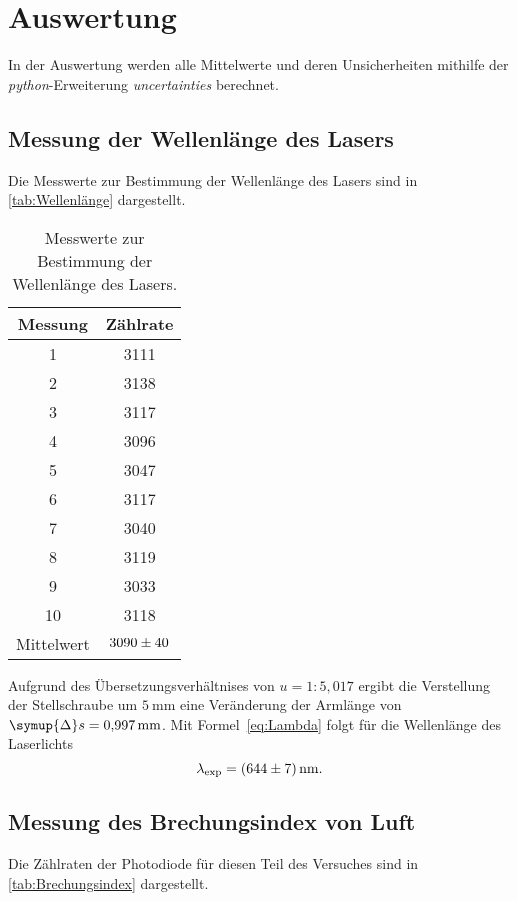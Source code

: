 \section{Auswertung}
\label{sec:Auswertung}
In der Auswertung werden alle Mittelwerte und deren Unsicherheiten mithilfe der \textit{python}-Erweiterung 
\textit{uncertainties} \cite{uncertainties} berechnet.

\subsection{Messung der Wellenlänge des Lasers}
Die Messwerte zur Bestimmung der Wellenlänge des Lasers sind in \autoref{tab:Wellenlänge} dargestellt.
\begin{table} [H]
    \centering
    \caption{Messwerte zur Bestimmung der Wellenlänge des Lasers.}
    \label{tab:Wellenlänge}
    \begin{tabular}{S S}
      \toprule
      {Messung} & {Zählrate} \\
        & 3111 \\
      2  & 3138 \\
      3  & 3117 \\
      4  & 3096 \\
      5  & 3047 \\
      6  & 3117 \\
      7  & 3040 \\
      8  & 3119 \\
      9  & 3033 \\
      10 & 3118 \\
      \midrule
      {Mittelwert} & $\num{3090+-40}$ \\  
      \bottomrule
    \end{tabular}
\end{table}

Aufgrund des Übersetzungsverhältnises von $u = 1:5,017$ ergibt die Verstellung der Stellschraube um $\qty{5}{\milli\metre}$
eine Veränderung der Armlänge von $\symup{\Delta}s=\qty{0.997}{\milli\metre}$. Mit Formel~\eqref{eq:Lambda} folgt für die 
Wellenlänge des Laserlichts
\begin{equation*}
    \lambda_{\text{exp}} = \qty{644+-7}{\nano\metre}.
\end{equation*}

\subsection{Messung des Brechungsindex von Luft}
Die Zählraten der Photodiode für diesen Teil des Versuches sind in \autoref{tab:Brechungsindex} dargestellt.
 
